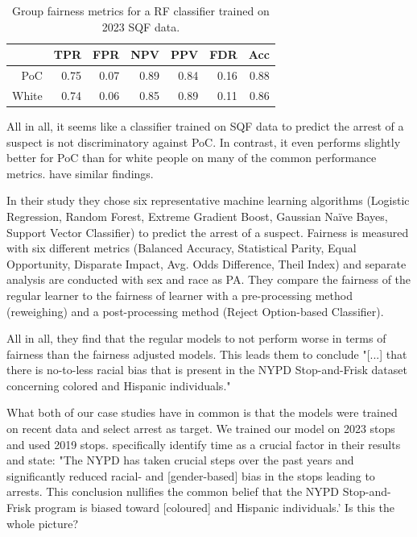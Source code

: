 \begin{table}[ht]
  \centering
  \begin{tabular}{|rrrrrrr|}
    \hline
   & TPR & FPR & NPV & PPV & FDR & Acc \\ 
    \hline
    PoC & 0.75 & 0.07 & 0.89 & 0.84 & 0.16 & 0.88 \\ 
    White & 0.74 & 0.06 & 0.85 & 0.89 & 0.11 & 0.86 \\ 
     \hline
  \end{tabular}
  \caption{Group fairness metrics for a RF classifier trained on 2023 SQF data.} 
  \label{tab:groupwise_metrics_2023}
\end{table}

All in all, it seems like a classifier trained on SQF data to predict the arrest of a suspect is not discriminatory against PoC. In contrast, it even performs slightly better for PoC than for white people on many of the common performance metrics. \cite{Badr2022DTFANSP} have similar findings.\par
In their study they chose six representative machine learning algorithms (Logistic Regression, Random Forest, Extreme Gradient Boost, Gaussian Naïve Bayes, Support Vector Classifier) to predict the arrest of a suspect. Fairness is measured with six different metrics (Balanced Accuracy, Statistical Parity, Equal Opportunity, Disparate Impact, Avg. Odds Difference, Theil Index) and separate analysis are conducted with sex and race as PA.
They compare the fairness of the regular learner to the fairness of learner with a pre-processing method (reweighing) and a post-processing method (Reject Option-based Classifier).\par
All in all, they find that the regular models to not perform worse in terms of fairness than the fairness adjusted models. This leads them to conclude "[...] that there is no-to-less racial bias that is present in the NYPD Stop-and-Frisk dataset concerning colored and Hispanic individuals."\par
What both of our case studies have in common is that the models were trained on recent data and select arrest as target. We trained our model on 2023 stops and \cite{Badr2022DTFANSP} used 2019 stops. \cite{Badr2022DTFANSP} specifically identify time as a crucial factor in their results and state: "The NYPD has taken crucial steps over the past years and significantly reduced racial- and [gender-based] bias in the stops leading to arrests. This conclusion nullifies the common belief that the NYPD Stop-and-Frisk program is biased toward [coloured] and Hispanic individuals.' Is this the whole picture?





